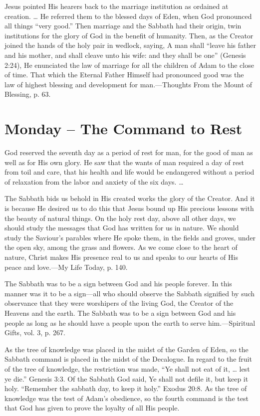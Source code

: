 \documentclass[a4paper, 10pt, twoside, headings=small]{scrartcl}
\begin{document}
\begin{multicols}{2}
Jesus pointed His hearers back to the marriage institution as ordained at creation. … He referred them to the blessed days of Eden, when God pronounced all things “very good.” Then marriage and the Sabbath had their origin, twin institutions for the glory of God in the benefit of humanity. Then, as the Creator joined the hands of the holy pair in wedlock, saying, A man shall “leave his father and his mother, and shall cleave unto his wife: and they shall be one” (Genesis 2:24), He enunciated the law of marriage for all the children of Adam to the close of time. That which the Eternal Father Himself had pronounced good was the law of highest blessing and development for man.—Thoughts From the Mount of Blessing, p. 63.

\section*{Monday – The Command to Rest}

God reserved the seventh day as a period of rest for man, for the good of man as well as for His own glory. He saw that the wants of man required a day of rest from toil and care, that his health and life would be endangered without a period of relaxation from the labor and anxiety of the six days. …

The Sabbath bids us behold in His created works the glory of the Creator. And it is because He desired us to do this that Jesus bound up His precious lessons with the beauty of natural things. On the holy rest day, above all other days, we should study the messages that God has written for us in nature. We should study the Saviour’s parables where He spoke them, in the fields and groves, under the open sky, among the grass and flowers. As we come close to the heart of nature, Christ makes His presence real to us and speaks to our hearts of His peace and love.—My Life Today, p. 140.

The Sabbath was to be a sign between God and his people forever. In this manner was it to be a sign—all who should observe the Sabbath signified by such observance that they were worshipers of the living God, the Creator of the Heavens and the earth. The Sabbath was to be a sign between God and his people as long as he should have a people upon the earth to serve him.—Spiritual Gifts, vol. 3, p. 267.

As the tree of knowledge was placed in the midst of the Garden of Eden, so the Sabbath command is placed in the midst of the Decalogue. In regard to the fruit of the tree of knowledge, the restriction was made, “Ye shall not eat of it, … lest ye die.” Genesis 3:3. Of the Sabbath God said, Ye shall not defile it, but keep it holy. “Remember the sabbath day, to keep it holy.” Exodus 20:8. As the tree of knowledge was the test of Adam’s obedience, so the fourth command is the test that God has given to prove the loyalty of all His people.


\end{multicols}
\end{document}
